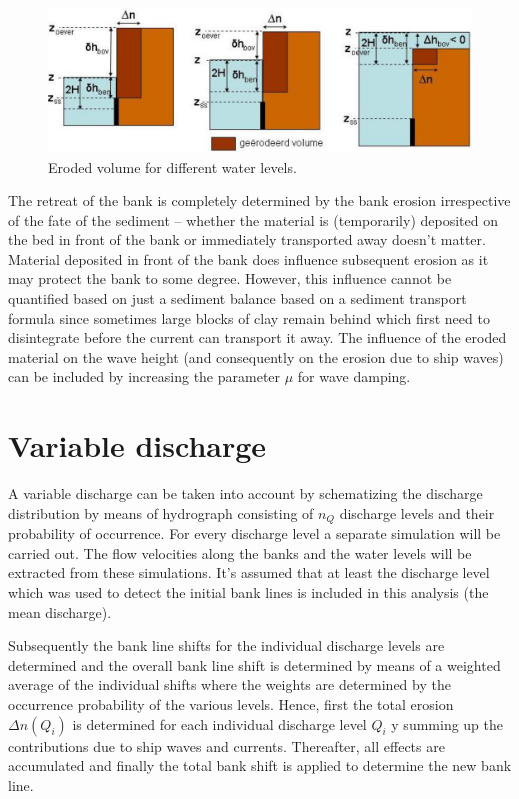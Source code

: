 \begin{figure}
\includegraphics[width=\textwidth]{figures/Fig4-5.png}
\caption{Eroded volume for different water levels.}
\label{Fig4.5}
\end{figure}

The retreat of the bank is completely determined by the bank erosion irrespective of the fate of the sediment -- whether the material is (temporarily) deposited on the bed in front of the bank or immediately transported away doesn't matter.
Material deposited in front of the bank does influence subsequent erosion as it may protect the bank to some degree.
However, this influence cannot be quantified based on just a sediment balance based on a sediment transport formula since sometimes large blocks of clay remain behind which first need to disintegrate before the current can transport it away.
The influence of the eroded material on the wave height (and consequently on the erosion due to ship waves) can be included by increasing the parameter $\mu$ for wave damping.

\section{Variable discharge} \label{Sec4.5}

A variable discharge can be taken into account by schematizing the discharge distribution by means of hydrograph consisting of $n_Q$ discharge levels and their probability of occurrence.
For every discharge level a separate \dflowfm simulation will be carried out.
The flow velocities along the banks and the water levels will be extracted from these simulations.
It's assumed that at least the discharge level which was used to detect the initial bank lines is included in this analysis (the mean discharge).

Subsequently the bank line shifts for the individual discharge levels are determined and the overall bank line shift is determined by means of a weighted average of the individual shifts where the weights are determined by the occurrence probability of the various levels.
Hence, first the total erosion $\Delta n ( Q_i )$ is determined for each individual discharge level $Q_i$ y summing up the contributions due to ship waves and currents.
Thereafter, all effects are accumulated and finally the total bank shift is applied to determine the new bank line.


